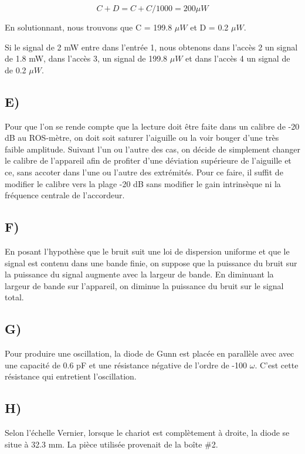 \begin{equation}
	C+D = C+C/1000 = 200\mu W
\end{equation}

En solutionnant, nous trouvons que C = 199.8 $\mu W$ et D = 0.2 $\mu W$.

Si le signal de 2 mW entre dans l'entrée 1, nous obtenons dans l'accès 2 un signal de 1.8 mW, dans l'accès 3, un signal de 199.8 $\mu W$ et dans l'accès 4 un signal de de 0.2 $\mu W$.

\subsection{E)}
Pour que l'on se rende compte que la lecture doit être faite dans un calibre de -20 dB au ROS-mètre, on doit soit saturer l'aiguille ou la voir bouger d'une très faible amplitude. Suivant l'un ou l'autre des cas, on décide de simplement changer le calibre de l'appareil afin de profiter d'une déviation supérieure de l'aiguille et ce, sans accoter dans l'une ou l'autre des extrémités. Pour ce faire, il suffit de modifier le calibre vers la plage -20 dB sans modifier le gain intrinsèque ni la fréquence centrale de l'accordeur. 

\subsection{F)}
En posant l'hypothèse que le bruit suit une loi de dispersion uniforme et que le signal est contenu dans une bande finie, on suppose que la puissance du bruit sur la puissance du signal augmente avec la largeur de bande. En diminuant la largeur de bande sur l'appareil, on diminue la puissance du bruit sur le signal total. 

\subsection{G)}
Pour produire une oscillation, la diode de Gunn est placée en parallèle avec avec une capacité de 0.6 pF et une résistance négative de l'ordre de -100 $\omega$. C'est cette résistance qui entretient l'oscillation.

\subsection{H)}
Selon l'échelle Vernier, lorsque le chariot est complètement à droite, la diode se situe à 32.3 mm. La pièce utilisée provenait de la boîte \#2.

